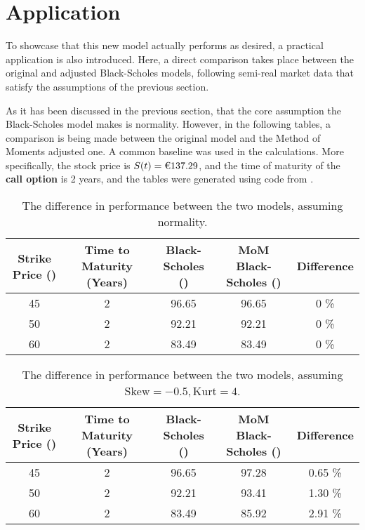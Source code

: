 
\section{Application}
\label{sec: application}
To showcase that this new model actually performs as desired, a practical application is also introduced. Here, a direct comparison takes place between the original and adjusted Black-Scholes models, following semi-real market data that satisfy the assumptions of the previous section.

As it has been discussed in the previous section, that the core assumption the Black-Scholes model makes is normality. However, in the following tables, a comparison is being made between the original model and the Method of Moments adjusted one. A common baseline was used in the calculations. More specifically, the stock price is \( S(t) = \text{\texteuro} 137.29 \), and the time of maturity of the \textbf{call option} is 2 years, and the tables were generated using code from \cite{githubrepo}.

\begin{table}[H]
	\centering
	\begin{tabular}{|c|c|c|c|c|}
		\hline
		Strike Price (\texteuro) & Time to Maturity (Years)	& Black-Scholes (\texteuro)	& MoM Black-Scholes (\texteuro)	& Difference \\
		\hline
		45 & 2 & 96.65 & 96.65 & 0 \% \\
		50 & 2 & 92.21 & 92.21 & 0 \% \\
		60 & 2 & 83.49 & 83.49 & 0 \% \\
		\hline
	\end{tabular}
	\caption{The difference in performance between the two models, assuming normality.}
\end{table}

\begin{table}[H]
	\centering
	\begin{tabular}{|c|c|c|c|c|}
		\hline
		Strike Price (\texteuro) & Time to Maturity (Years)	& Black-Scholes (\texteuro)	& MoM Black-Scholes (\texteuro)	& Difference \\
		\hline
		45 & 2 & 96.65 & 97.28 & 0.65 \% \\
		50 & 2 & 92.21 & 93.41 & 1.30 \% \\
		60 & 2 & 83.49 & 85.92 & 2.91 \% \\
		\hline
	\end{tabular}
	\caption{The difference in performance between the two models, assuming \(\text{Skew} = -0.5, \text{Kurt} = 4 \).}
\end{table}

